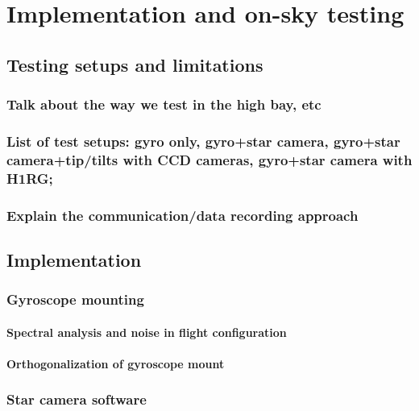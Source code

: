 
\chapter[Implementation and on-sky testing]{Implementation and on-sky testing} %




\section{Testing setups and limitations}
\subsection{Talk about the way we test in the high bay, etc}
\subsection{List of test setups: gyro only, gyro+star camera, gyro+star camera+tip/tilts with CCD cameras, gyro+star camera with H1RG;}
\subsection{Explain the communication/data recording approach}
\section{Implementation}
\subsection{Gyroscope mounting}
\subsubsection{Spectral analysis and noise in flight configuration}
\subsubsection{Orthogonalization of gyroscope mount}



\subsection{Star camera software}
